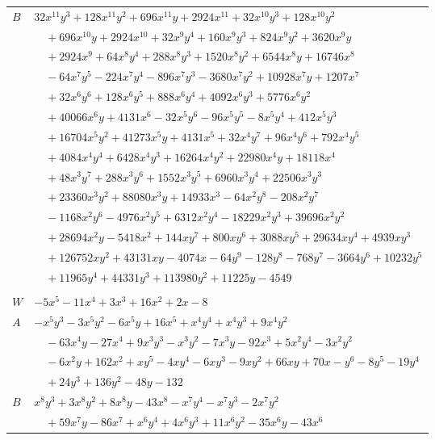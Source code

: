 \documentclass[11pt]{article}
\begin{document}
\begin{longtable}{@{}ll@{}}
$B$ & $32x^{11}y^{3}+128x^{11}y^{2}+696x^{11}y+2924x^{11}+32x^{10}y^{3}+128x^{10}y^{2}$\\
 & $\quad +696x^{10}y+2924x^{10}+32x^{9}y^{4}+160x^{9}y^{3}+824x^{9}y^{2}+3620x^{9}y$\\
 & $\quad +2924x^{9}+64x^{8}y^{4}+288x^{8}y^{3}+1520x^{8}y^{2}+6544x^{8}y+16746x^{8}$\\
 & $\quad -64x^{7}y^{5}-224x^{7}y^{4}-896x^{7}y^{3}-3680x^{7}y^{2}+10928x^{7}y+1207x^{7}$\\
 & $\quad +32x^{6}y^{6}+128x^{6}y^{5}+888x^{6}y^{4}+4092x^{6}y^{3}+5776x^{6}y^{2}$\\
 & $\quad +40066x^{6}y+4131x^{6}-32x^{5}y^{6}-96x^{5}y^{5}-8x^{5}y^{4}+412x^{5}y^{3}$\\
 & $\quad +16704x^{5}y^{2}+41273x^{5}y+4131x^{5}+32x^{4}y^{7}+96x^{4}y^{6}+792x^{4}y^{5}$\\
 & $\quad +4084x^{4}y^{4}+6428x^{4}y^{3}+16264x^{4}y^{2}+22980x^{4}y+18118x^{4}$\\
 & $\quad +48x^{3}y^{7}+288x^{3}y^{6}+1552x^{3}y^{5}+6960x^{3}y^{4}+22506x^{3}y^{3}$\\
 & $\quad +23360x^{3}y^{2}+88080x^{3}y+14933x^{3}-64x^{2}y^{8}-208x^{2}y^{7}$\\
 & $\quad -1168x^{2}y^{6}-4976x^{2}y^{5}+6312x^{2}y^{4}-18229x^{2}y^{3}+39696x^{2}y^{2}$\\
 & $\quad +28694x^{2}y-5418x^{2}+144xy^{7}+800xy^{6}+3088xy^{5}+29634xy^{4}+4939xy^{3}$\\
 & $\quad +126752xy^{2}+43131xy-4074x-64y^{9}-128y^{8}-768y^{7}-3664y^{6}+10232y^{5}$\\
 & $\quad +11965y^{4}+44331y^{3}+113980y^{2}+11225y-4549$\\
\addlinespace[3pt]
\multicolumn{2}{@{}l}{$g=2$, $i=25$, $m=1$, neighbours $45,2,4,7,8,11,24,33,39$}\\
$W$ & $-5x^{5}-11x^{4}+3x^{3}+16x^{2}+2x-8$\\
$A$ & $-x^{5}y^{3}-3x^{5}y^{2}-6x^{5}y+16x^{5}+x^{4}y^{4}+x^{4}y^{3}+9x^{4}y^{2}$\\
 & $\quad -63x^{4}y-27x^{4}+9x^{3}y^{3}-x^{3}y^{2}-7x^{3}y-92x^{3}+5x^{2}y^{4}-3x^{2}y^{2}$\\
 & $\quad -6x^{2}y+162x^{2}+xy^{5}-4xy^{4}-6xy^{3}-9xy^{2}+66xy+70x-y^{6}-8y^{5}-19y^{4}$\\
 & $\quad +24y^{3}+136y^{2}-48y-132$\\
$B$ & $x^{8}y^{3}+3x^{8}y^{2}+8x^{8}y-43x^{8}-x^{7}y^{4}-x^{7}y^{3}-2x^{7}y^{2}$\\
 & $\quad +59x^{7}y-86x^{7}+x^{6}y^{4}+4x^{6}y^{3}+11x^{6}y^{2}-35x^{6}y-43x^{6}$\\

\end{longtable}
\end{document}
